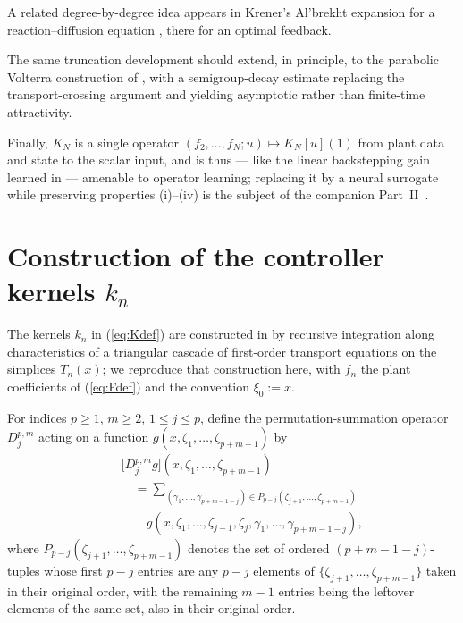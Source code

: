 \documentclass[amsthm]{autart}
\theoremstyle{plain}
\theoremstyle{definition}
\begin{document}
A related degree-by-degree idea appears in Krener's Al'brekht expansion for a reaction--diffusion equation \cite{9580683}, there for an optimal feedback.

The same truncation development should extend, in principle, to the parabolic Volterra construction of \cite{vazquez2008volterra1,vazquez2008volterra2}, with a semigroup-decay estimate replacing the transport-crossing argument and yielding asymptotic rather than finite-time attractivity.

Finally, $K_N$ is a single operator $(f_2, \ldots, f_N; u) \mapsto K_N[u](1)$ from plant data and state to the scalar input, and is thus --- like the linear backstepping gain learned in \cite{Bhan2024Neural} --- amenable to operator learning; replacing it by a neural surrogate while preserving properties (i)--(iv) is the subject of the companion Part~II~\cite{krstic2026feedbacklinearizationhyperbolicpdes-NO}.

\appendix

\section{Construction of the controller kernels $k_n$}\label{app:kndef}

The kernels $k_n$ in (\ref{eq:Kdef}) are constructed in \cite{krstic2026feedbacklinearizationhyperbolicpdes} by recursive integration along characteristics of a triangular cascade of first-order transport equations on the simplices $T_n(x)$; we reproduce that construction here, with $f_n$ the plant coefficients of (\ref{eq:Fdef}) and the convention $\xi_0 := x$.

For indices $p \ge 1$, $m \ge 2$, $1 \le j \le p$, define the permutation-summation operator $D_j^{p,m}$ acting on a function $g(x, \zeta_1, \ldots, \zeta_{p+m-1})$ by
\begin{eqnarray}
&& \bigl[D_j^{p,m} g\bigr](x, \zeta_1, \ldots, \zeta_{p+m-1}) \nonumber \\
&& \quad = \sum_{(\gamma_1,\ldots,\gamma_{p+m-1-j}) \in P_{p-j}(\zeta_{j+1},\ldots,\zeta_{p+m-1})} \nonumber \\
&& \quad\quad g(x, \zeta_1, \ldots, \zeta_{j-1}, \zeta_j, \gamma_1, \ldots, \gamma_{p+m-1-j}),
\label{eq:Ddef}
\end{eqnarray}
where $P_{p-j}(\zeta_{j+1}, \ldots, \zeta_{p+m-1})$ denotes the set of ordered $(p+m-1-j)$-tuples whose first $p-j$ entries are any $p-j$ elements of $\{\zeta_{j+1}, \ldots, \zeta_{p+m-1}\}$ taken in their original order, with the remaining $m-1$ entries being the leftover elements of the same set, also in their original order.
\end{document}
